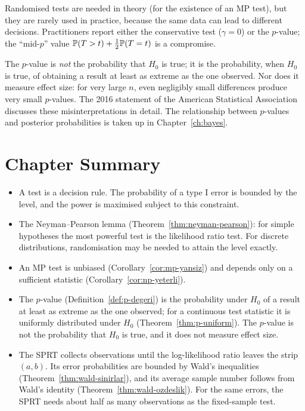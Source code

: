 \documentclass[main.tex]{subfiles}
\begin{document}
\begin{remark}
Randomised tests are needed in theory (for the existence of an MP test), but they are rarely used in practice, because the same data can lead to different decisions. Practitioners report either the conservative test ($\gamma=0$) or the $p$-value; the ``mid-$p$'' value $\P(T>t)+\frac12\P(T=t)$ is a compromise.
\end{remark}

\begin{remark}
The $p$-value is \emph{not} the probability that $H_0$ is true; it is the probability, when $H_0$ is true, of obtaining a result at least as extreme as the one observed. Nor does it measure effect size: for very large $n$, even negligibly small differences produce very small $p$-values. The 2016 statement of the American Statistical Association \cite{wasserstein16} discusses these misinterpretations in detail. The relationship between $p$-values and posterior probabilities is taken up in Chapter~\ref{ch:bayes}.
\end{remark}

\section{Chapter Summary}
\begin{summary}
\begin{itemize}
  \item A test is a decision rule. The probability of a type I error is bounded by the level, and the power is maximised subject to this constraint.
  \item The Neyman--Pearson lemma (Theorem~\ref{thm:neyman-pearson}): for simple hypotheses the most powerful test is the likelihood ratio test. For discrete distributions, randomisation may be needed to attain the level exactly.
  \item An MP test is unbiased (Corollary~\ref{cor:mp-yansiz}) and depends only on a sufficient statistic (Corollary~\ref{cor:np-yeterli}).
  \item The $p$-value (Definition~\ref{def:p-degeri}) is the probability under $H_0$ of a result at least as extreme as the one observed; for a continuous test statistic it is uniformly distributed under $H_0$ (Theorem~\ref{thm:p-uniform}). The $p$-value is not the probability that $H_0$ is true, and it does not measure effect size.
  \item The SPRT collects observations until the log-likelihood ratio leaves the strip $(a,b)$. Its error probabilities are bounded by Wald's inequalities (Theorem~\ref{thm:wald-sinirlar}), and its average sample number follows from Wald's identity (Theorem~\ref{thm:wald-ozdeslik}). For the same errors, the SPRT needs about half as many observations as the fixed-sample test.
\end{itemize}
\end{summary}
\end{document}
